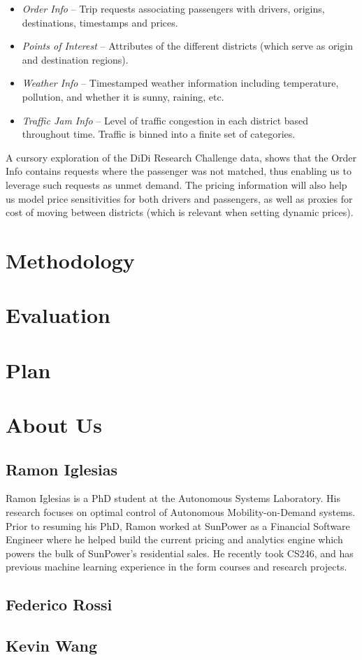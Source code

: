 \documentclass[10pt]{article}
\begin{document}
\begin{itemize}
  \item {\emph{Order Info}} -- Trip requests associating passengers with drivers, origins, destinations, timestamps and prices. 
  \item {\emph{Points of Interest}} -- Attributes of the different districts (which serve as origin and destination regions).
  \item {\emph{Weather Info}} -- Timestamped weather information including temperature, pollution, and whether it is sunny, raining, etc.
  \item {\emph{Traffic Jam Info}} -- Level of traffic congestion in each district based throughout time. Traffic is binned into a finite set of categories.
\end{itemize}

A cursory exploration of the DiDi Research Challenge data, shows that the Order Info contains requests where the passenger was not matched, thus enabling us to leverage such requests as unmet demand. The pricing information will also help us model price sensitivities for both drivers and passengers, as well as proxies for cost of moving between districts (which is relevant when setting dynamic prices).

\section{Methodology}\label{methods}


\section{Evaluation}\label{evaluation}


\section{Plan}\label{plan}


\section{About Us}\label{about}

\subsection*{Ramon Iglesias}
Ramon Iglesias is a PhD student at the Autonomous Systems Laboratory. His research focuses on optimal control of Autonomous Mobility-on-Demand systems. Prior to resuming his PhD, Ramon worked at SunPower as a Financial Software Engineer where he helped build the current pricing and analytics engine which powers the bulk of SunPower's residential sales. He recently took CS246, and has previous machine learning experience in the form courses and research projects.

\subsection*{Federico Rossi}

\subsection*{Kevin Wang}


\end{document}
